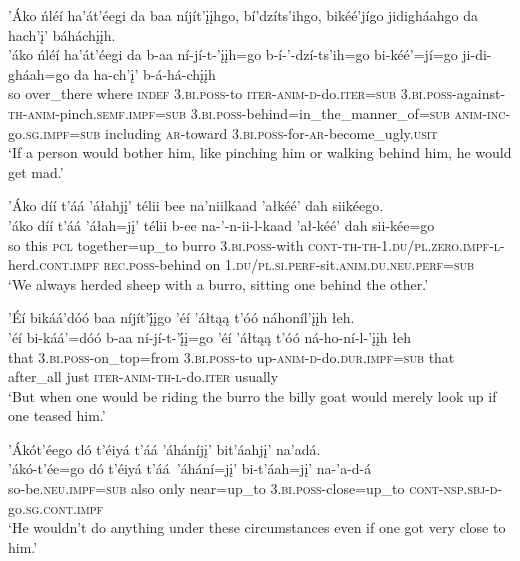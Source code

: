 \ea\label{ex:text6-7-5}
’Áko ńléí ha’át’éegi da baa níjít’įįhgo, bí’dzíts’ihgo, bikéé’jígo jidigháahgo da hach’į’ báháchįįh.\\
\gll ’áko	ńléí	ha’át’éegi	da	b-aa	ní-jí-t-’įįh=go	b-í-’-dzí-ts’ih=go	bi-kéé’=jí=go	ji-di-gháah=go	da	ha-ch’į’	b-á-há-chįįh\\
     so	over\_there	where	\textsc{indef}	3.\textsc{bi}.\textsc{poss}-to	\textsc{iter}-\textsc{anim}-\textsc{d}-do.\textsc{iter}=\textsc{sub}	3.\textsc{bi}.\textsc{poss}-against-\textsc{th}-\textsc{anim}-pinch.\textsc{semf}.\textsc{impf}=\textsc{sub}	3.\textsc{bi}.\textsc{poss}-behind=in\_the\_manner\_of=\textsc{sub}	\textsc{anim}-\textsc{inc}-go.\textsc{sg}.\textsc{impf}=\textsc{sub}	including	\textsc{ar}-toward	3.\textsc{bi}.\textsc{poss}-for-\textsc{ar}-become\_ugly.\textsc{usit}\\
\glt `If a person would bother him, like pinching him or walking behind him, he would get mad.'
\z

\ea\label{ex:text6-7-6}
’Áko díí t’áá ’áłahjį’ télii bee na’niilkaad ’ałkéé’ dah siikéego.\\
\gll ’áko	díí	t’áá	’áłah=jį’	télii	b-ee	na-’-n-ii-l-kaad	’ał-kéé’	dah	sii-kée=go\\
     so	this	\textsc{pcl}	together=up\_to	burro	3.\textsc{bi}.\textsc{poss}-with	\textsc{cont}-\textsc{th}-\textsc{th}-1.\textsc{du}/\textsc{pl}.\textsc{zero}.\textsc{impf}-\textsc{l}-herd.\textsc{cont}.\textsc{impf}	\textsc{rec}.\textsc{poss}-behind	on	1.\textsc{du}/\textsc{pl}.\textsc{si}.\textsc{perf}-sit.\textsc{anim}.\textsc{du}.\textsc{neu}.\textsc{perf}=\textsc{sub}\\
\glt `We always herded sheep with a burro, sitting one behind the other.'
\z

\ea\label{ex:text6-7-7}
’Éí bikáá’dóó baa níjít’į́įgo ’éí ’áłtąą t’óó náhoníl’įįh łeh.\\
\gll ’éí	bi-káá’=dóó	b-aa	ní-jí-t-’į́į=go	’éí	’áłtąą	t’óó	ná-ho-ní-l-’įįh	łeh\\
     that	3.\textsc{bi}.\textsc{poss}-on\_top=from	3.\textsc{bi}.\textsc{poss}-to	up-\textsc{anim}-\textsc{d}-do.\textsc{dur}.\textsc{impf}=\textsc{sub}	that	after\_all	just	\textsc{iter}-\textsc{anim}-\textsc{th}-\textsc{l}-do.\textsc{iter}	usually\\
\glt `But when one would be riding the burro the billy goat would merely look up if one teased him.'
\z

\newpage
\ea\label{ex:text6-7-8}
’Ákót’éego dó t’éiyá t’áá ’áháníjį’ bit’áahjį’ na’adá.\\
\gll ’ákó-t’ée=go	dó	t’éiyá	t’áá~{’áhání=jį’}	bi-t’áah=jį’	na-’a-d-á\\
     so-be.\textsc{neu}.\textsc{impf}=\textsc{sub}	also	only	near=up\_to	3.\textsc{bi}.\textsc{poss}-close=up\_to	\textsc{cont}-\textsc{nsp}.\textsc{sbj}-\textsc{d}-go.\textsc{sg}.\textsc{cont}.\textsc{impf}\\
\glt `He wouldn't do anything under these circumstances even if one got very close to him.'
\z

